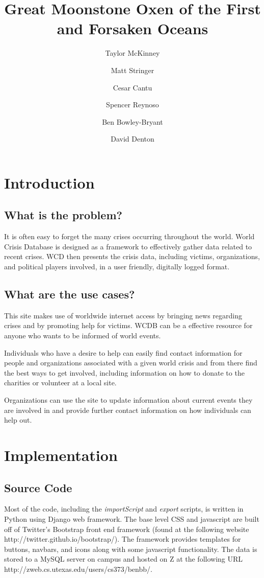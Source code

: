 \documentclass[12pt]{report}
\title{Great Moonstone Oxen of the First and Forsaken Oceans}
\author{
    Taylor McKinney
    \and Matt Stringer
    \and Cesar Cantu
    \and Spencer Reynoso
    \and Ben Bowley-Bryant
    \and David Denton}
\begin{document}
\maketitle

\section*{Introduction}
\subsection*{What is the problem?}
\hfill


It is often easy to forget the many crises occurring throughout the world.
World Crisis Database is designed as a framework to effectively gather data related to recent crises. WCD then presents the crisis data, including victims, organizations, and political players involved, in a user friendly, digitally logged format.

\subsection*{What are the use cases?}
\hfill


This site makes use of worldwide internet access by bringing news regarding crises and by promoting help for victims. WCDB can be a effective resource for anyone who wants to be informed of world events.


Individuals who have a desire to help can easily find contact information for people and organizations associated with a given world crisis and from there find the best ways to get involved, including information on how to donate to the charities or volunteer at a local site.


Organizations can use the site to update information about current events they are involved in and provide further contact information on how individuals can help out.

\newpage
\section*{Implementation}
\hfill


\subsection*{Source Code}
\hfill


Most of the code, including the \emph{importScript} and \emph{export} scripts, is written in Python using Django web framework. The base level CSS and javascript are built off of Twitter's Bootstrap front end framework (found at the following website http://twitter.github.io/bootstrap/). The framework provides templates for buttons, navbars, and icons along with some javascript functionality. The data is stored to a MySQL server on campus and hosted on Z at the following URL http://zweb.cs.utexas.edu/users/cs373/benbb/.
\end{document}
